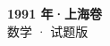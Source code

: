 \documentclass[zihao=-4, a4paper]{ctexart}
\begin{document}
\begin{center}
  {\Large\bfseries 1991 年·上海卷}\\[4pt]
  {\large 数学 · 试题版}
\end{center}
\medskip
{}

\end{document}
